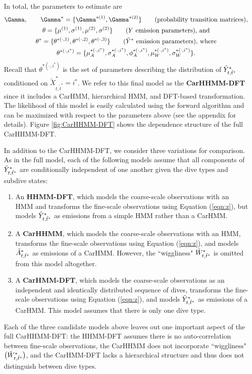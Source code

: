 In total, the parameters to estimate are
%
\begin{gather*}
    \Gamma, \qquad \Gamma^{*} = \{\Gamma^{*(1)},\Gamma^{*(2)}\} \qquad \text{(probability transition matrices)}, \\
    \theta = \{\mu^{(1)},\sigma^{(1)},\mu^{(2)},\sigma^{(2)}\} \qquad \text{($Y$ emission parameters), and} \\
    \theta^* = \{\theta^{*(\cdot,1)},\theta^{*(\cdot,2)},\theta^{*(\cdot,3)}\}  \qquad \text{($\Z$ emission parameters), where} \\
    \theta^{*(\cdot,i^*)} =  \{\mu_A^{*(\cdot,i^*)},\sigma_A^{*(\cdot,i^*)},\phi_A^{*(\cdot,i^*)},\mu_W^{*(\cdot,i^*)},\sigma_W^{*(\cdot,i^*)}\}.
\end{gather*}
%
Recall that $\theta^{*(\cdot,i^*)}$ is the set of parameters describing the distribution of $\tilde{Y}^*_{t,\tilde t^*}$ conditioned on $\tilde X^*_{t,\tilde t^*} = i^*$. 
%
We refer to this final model as the \textbf{CarHHMM-DFT} since it includes a CarHMM, hierarchical HMM, and DFT-based transformation. The likelihood of this model is easily calculated using the forward algorithm and can be maximized with respect to the parameters above (see the appendix for details). Figure \ref{fig:CarHHMM-DFT} shows the dependence structure of the full CarHHMM-DFT.

In addition to the CarHHMM-DFT, we consider three variations for comparison. As in the full model, each of the following models assume that all components of $\tilde{Y}^*_{t,\tilde t^*}$ are conditionally independent of one another given the dive types and subdive states:
\begin{enumerate}
    \item An \textbf{HHMM-DFT}, which models the coarse-scale observations with an HMM and transforms the fine-scale observations using Equation (\ref{eqn:z}), but models $\tilde{Y}^*_{t,\tilde t^*}$ as emissions from a simple HMM rather than a CarHMM.
    \item A \textbf{CarHHMM}, which models the coarse-scale observations with an HMM, transforms the fine-scale observations using Equation (\ref{eqn:z}), and models $\tilde{A}^*_{t,\tilde t^*}$ as emissions of a CarHMM. However, the ``wiggliness"  $\tilde{W}^*_{t,\tilde t^*}$ is omitted from this model altogether.
    \item A \textbf{CarHMM-DFT}, which models the coarse-scale observations as an independent and identically distributed sequence of dives, transforms the fine-scale observations using Equation (\ref{eqn:z}), and models $\tilde{Y}^*_{t,\tilde t^*}$ as emissions of a CarHMM. This model assumes that there is only one dive type.
\end{enumerate}
%
Each of the three candidate models above leaves out one important aspect of the full CarHHMM-DFT: the HHMM-DFT assumes there is no auto-correlation between fine-scale observations, the CarHHMM does not incorporate ``wiggliness" $\big(\tilde{W}^*_{t,\tilde t^*}\big)$, and the CarHMM-DFT lacks a hierarchical structure and thus does not distinguish between dive types.

